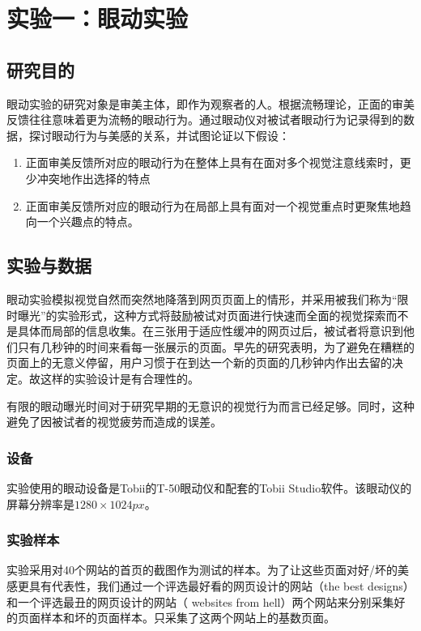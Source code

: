\chapter{实验一：眼动实验}
\label{exp1}

\section{研究目的}
眼动实验的研究对象是审美主体，即作为观察者的人。根据流畅理论，正面的审美反馈往往意味着更为流畅的眼动行为。通过眼动仪对被试者眼动行为记录得到的数据，探讨眼动行为与美感的关系，并试图论证以下假设：

\begin{enumerate}
  \item 正面审美反馈所对应的眼动行为在整体上具有在面对多个视觉注意线索时，更少冲突地作出选择的特点
  \item 正面审美反馈所对应的眼动行为在局部上具有面对一个视觉重点时更聚焦地趋向一个兴趣点的特点。
\end{enumerate}

\section{实验与数据}
眼动实验模拟视觉自然而突然地降落到网页页面上的情形，并采用被我们称为“限时曝光”的实验形式，这种方式将鼓励被试对页面进行快速而全面的视觉探索而不是具体而局部的信息收集。在三张用于适应性缓冲的网页过后，被试者将意识到他们只有几秒钟的时间来看每一张展示的页面。早先的研究表明，为了避免在糟糕的页面上的无意义停留，用户习惯于在到达一个新的页面的几秒钟内作出去留的决定。故这样的实验设计是有合理性的。

有限的眼动曝光时间对于研究早期的无意识的视觉行为而言已经足够。同时，这种避免了因被试者的视觉疲劳而造成的误差。

\subsection{设备}
实验使用的眼动设备是Tobii的T-50眼动仪和配套的Tobii Studio软件。该眼动仪的屏幕分辨率是$1280\times1024px$。

\subsection{实验样本}
实验采用对40个网站的首页的截图作为测试的样本。为了让这些页面对好/坏的美感更具有代表性，我们通过一个评选最好看的网页设计的网站（the best designs\footnotemark[1]）和一个评选最丑的网页设计的网站（ websites from hell\footnotemark[2]）两个网站来分别采集好的页面样本和坏的页面样本。只采集了这两个网站上的基数页面。

